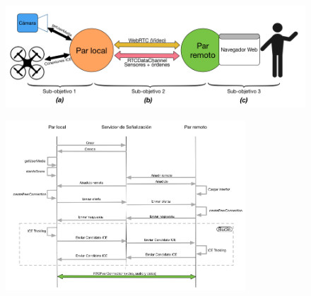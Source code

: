 \documentclass[notes,slidesec,a4]{seminar}
\begin{document}


\begin{hslide}
\begin{center}
\begin{figure}
\includegraphics[width=1.1\textwidth]{img/esquema_general}
\end{figure}
\end{center}
\end{hslide}




\begin{hslide}
\begin{center}
\begin{figure}
\includegraphics[width=0.8\textwidth]{img/diagrama_general}
\end{figure}
\end{center}
\end{hslide}

\end{document}
